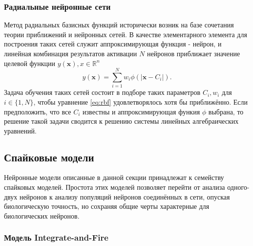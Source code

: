 \documentclass[a4paper,10pt]{article}
\begin{document}
\subsubsection{Радиальные нейронные сети}
\indent Метод радиальных базисных функций исторически возник на базе сочетания теории приближений и нейронных сетей. В качестве элементарного элемента для построения таких сетей служит аппроксимирующая функция - нейрон, и  линейная комбинация результатов активации $N$ нейронов приближает значение целевой функции $y(\boldsymbol{x}), x\in \mathbb{R}^n$
   \begin{equation}\label{eq:rbf}
   y(\boldsymbol{x}) = \sum_{i=1}^{N}w_{i}\phi(|\boldsymbol{x}-C_{i}|).
   \end{equation}
\indent Задача обучения таких сетей состоит в подборе таких параметров $C_{i},w_{i}$ для $i\in \{1,N\}$, чтобы уравнение \eqref{eq:rbf} удовлетворялось хотя бы приближённо. Если предположить, что все $C_{i}$ известны и аппроксимирующая функия $\phi$ выбрана, то решение такой задачи сводится к решению системы линейных алгебраических уравнений. \\
\subsection{Спайковые модели}   
\indent Нейронные модели описанные в данной секции принадлежат к семейству спайковых моделей. Простота этих моделей позволяет перейти от анализа одного-двух нейронов к анализу популяций нейронов соединённых в сети, опуская биологическую точность, но сохраняя общие черты характерные для биологических нейронов.\\
\subsubsection{Модель Integrate-and-Fire}
\end{document}
